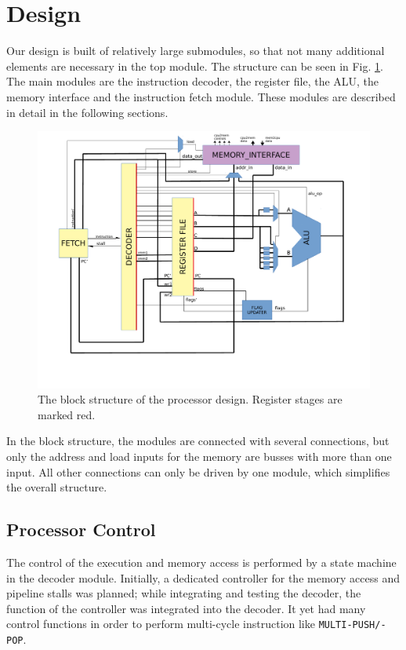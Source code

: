 \section{Design}
\label{sec:design}
Our design is built of relatively large submodules, so that not many additional elements are necessary in the top module. The structure can be seen in Fig. \ref{fig:processoroverview}. The main modules are the instruction decoder, the register file, the ALU, the memory interface and the instruction fetch module. These modules are described in detail in the following sections.

\begin{figure}[ht]
\centering
\includegraphics[scale=0.65]{images/processorOverview.pdf}
\caption{The block structure of the processor design. Register stages are marked red.}
\label{fig:processoroverview}
\end{figure}

In the block structure, the modules are connected with several connections, but only the address and load inputs for the memory are busses with more than one input. All other connections can only be driven by one module, which simplifies the overall structure. 

\subsection{Processor Control}
\label{subsec:processorcontrol}
The control of the execution and memory access is performed by a state machine in the decoder module. Initially, a dedicated controller for the memory access and pipeline stalls was planned; while integrating and testing the decoder, the function of the controller was integrated into the decoder. It yet had many control functions in order to perform multi-cycle instruction like \texttt{MULTI-PUSH/-POP}.

